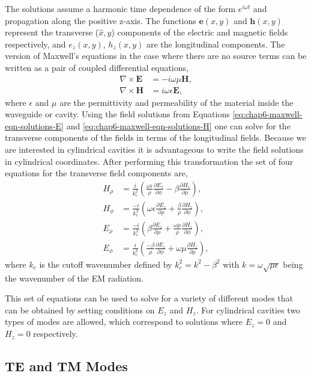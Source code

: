 The solutions assume a harmonic time dependence of the form $e^{i\omega t}$ and propagation along the positive z-axis. The functions $\bm{e}(x,y)$ and $\bm{h}(x,y)$ represent the transverse ($\hat{x}, \hat{y}$) components of the electric and magnetic fields respectively, and $e_z(x,y)$, $h_z(x,y)$ are the longitudinal components. The version of Maxwell's equations in the case where there are no source terms can be written as a pair of coupled differential equations, 
\begin{align}
    \nabla\times\bm{E}&=-i\omega\mu\bm{H},\\
    \nabla\times\bm{H}&=i\omega\epsilon\bm{E},
\end{align}
where $\epsilon$ and $\mu$ are the permittivity and permeability of the material inside the waveguide or cavity. Using the field solutions from Equations \ref{eq:chap6-maxwell-eqn-solutions-E} and \ref{eq:chap6-maxwell-eqn-solutions-H} one can solve for the transverse components of the fields in terms of the longitudinal fields. Because we are interested in cylindrical cavities it is advantageous to write the field solutions in cylindrical coordinates. After performing this transformation the set of four equations for the transverse field components are,
\begin{align}
    H_\rho&=\frac{i}{k_c^2}\left(\frac{\omega\epsilon}{\rho}\frac{\partial E_z}{\partial \phi}-\beta \frac{\partial H_z}{\partial \rho}\right),\\
    H_\phi&=\frac{-i}{k_c^2}\left(\omega\epsilon\frac{\partial E_z}{\partial \rho}+\frac{\beta}{\rho}\frac{\partial H_z}{\partial \phi}\right),\\
    E_\rho&=\frac{-i}{k_c^2}\left(\beta\frac{\partial E_z}{\partial \rho}+\frac{\omega\mu}{\rho}\frac{\partial H_z}{\partial \phi}\right),\\
    E_\phi&=\frac{i}{k_c^2}\left(\frac{-\beta}{\rho}\frac{\partial E_z}{\partial \phi}+\omega\mu\frac{\partial H_z}{\partial \rho}\right),
\end{align}
where $k_c$ is the cutoff wavenumber defined by $k_c^2=k^2-\beta^2$ with $k=\omega\sqrt{\mu\epsilon}$ being the wavenumber of the EM radiation. 

This set of equations can be used to solve for a variety of different modes that can be obtained by setting conditions on $E_z$ and $H_z$. For cylindrical cavities two types of modes are allowed, which correspond to solutions where $E_z=0$ and $H_z=0$ respectively. 

\subsection{TE and TM Modes}
\label{sec:chap6-TE-TM-modes}

